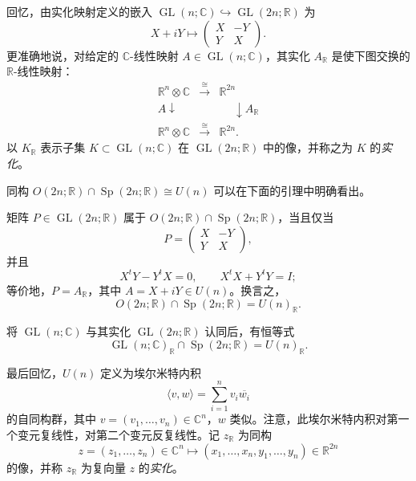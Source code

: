 回忆，由实化映射定义的嵌入 $\operatorname{GL}(n;\mathbb C)\hookrightarrow\operatorname{GL}(2n;\mathbb R)$ 为
\begin{equation}
  X+iY\longmapsto
  \begin{pmatrix}X&-Y\\Y&X\end{pmatrix}.
  \label{eq:2.2.13}
\end{equation}
更准确地说，对给定的 $\mathbb C$-线性映射 $A\in\operatorname{GL}(n;\mathbb C)$，其实化 $A_{\mathbb R}$ 是使下图交换的 $\mathbb R$-线性映射：
\[
\begin{array}{ccc}
 \mathbb R^n\otimes\mathbb C & \xrightarrow{\ \cong\ } & \mathbb R^{2n}\\
 {\scriptstyle A}\downarrow\phantom{\scriptstyle A} &&
 \phantom{\scriptstyle A_{\mathbb R}}\downarrow{\scriptstyle A_{\mathbb R}}\\
 \mathbb R^n\otimes\mathbb C & \xrightarrow{\ \cong\ } & \mathbb R^{2n}.
\end{array}
\]
以 $K_{\mathbb R}$ 表示子集 $K\subset\operatorname{GL}(n;\mathbb C)$ 在 $\operatorname{GL}(2n;\mathbb R)$ 中的像，并称之为 $K$ 的\emph{实化}。

同构 $O(2n;\mathbb R)\cap\operatorname{Sp}(2n;\mathbb R)\cong U(n)$ 可以在下面的引理中明确看出。

\begin{lemma}
\label{lem:orthogonal-symplectic-unitary}
矩阵 $P\in\operatorname{GL}(2n;\mathbb R)$ 属于
$O(2n;\mathbb R)\cap\operatorname{Sp}(2n;\mathbb R)$，当且仅当
\[
  P=\begin{pmatrix}X&-Y\\Y&X\end{pmatrix},
\]
并且
\[
  X^tY-Y^tX=0,
  \qquad X^tX+Y^tY=I;
\]
等价地，$P=A_{\mathbb R}$，其中 $A=X+iY\in U(n)$。换言之，
\[
  O(2n;\mathbb R)\cap\operatorname{Sp}(2n;\mathbb R)=U(n)_{\mathbb R}.
\]
\end{lemma}

将 $\operatorname{GL}(n;\mathbb C)$ 与其实化 $\operatorname{GL}(2n;\mathbb R)$ 认同后，有恒等式
\[
  \operatorname{GL}(n;\mathbb C)_{\mathbb R}\cap\operatorname{Sp}(2n;\mathbb R)
  =U(n)_{\mathbb R}.
\]

最后回忆，$U(n)$ 定义为埃尔米特内积
\begin{equation}
  \langle v,w\rangle=\sum_{i=1}^n v_i\overline{w_i}
  \label{eq:2.2.14}
\end{equation}
的自同构群，其中 $v=(v_1,\ldots,v_n)\in\mathbb C^n$，$w$ 类似。注意，此埃尔米特内积对第一个变元复线性，对第二个变元反复线性。记 $z_{\mathbb R}$ 为同构
\[
 z=(z_1,\ldots,z_n)\in\mathbb C^n
 \longmapsto(x_1,\ldots,x_n,y_1,\ldots,y_n)\in\mathbb R^{2n}
\]
的像，并称 $z_{\mathbb R}$ 为复向量 $z$ 的\emph{实化}。

